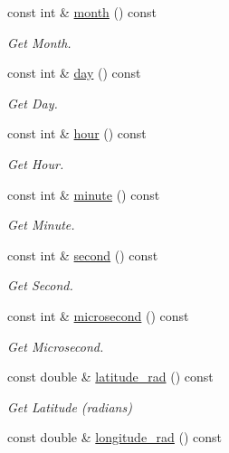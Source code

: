 \begin{DoxyCompactItemize}
const int \& \hyperlink{classosse_1_1collaborate_1_1_packet_raw_a1aec62b6f1c6ca8a332cbc1a9c299e25}{month} () const
\begin{DoxyCompactList}\small\item\em Get Month. \end{DoxyCompactList}\item 
const int \& \hyperlink{classosse_1_1collaborate_1_1_packet_raw_a4c492fb013220d09d08a6635c12ec055}{day} () const
\begin{DoxyCompactList}\small\item\em Get Day. \end{DoxyCompactList}\item 
const int \& \hyperlink{classosse_1_1collaborate_1_1_packet_raw_a265e1fc70e832947969c3d3b28b627cf}{hour} () const
\begin{DoxyCompactList}\small\item\em Get Hour. \end{DoxyCompactList}\item 
const int \& \hyperlink{classosse_1_1collaborate_1_1_packet_raw_ac8dab9ede92438259281e25bed6a72af}{minute} () const
\begin{DoxyCompactList}\small\item\em Get Minute. \end{DoxyCompactList}\item 
const int \& \hyperlink{classosse_1_1collaborate_1_1_packet_raw_a889491ddfb2a3602bae83ca547f7c45e}{second} () const
\begin{DoxyCompactList}\small\item\em Get Second. \end{DoxyCompactList}\item 
const int \& \hyperlink{classosse_1_1collaborate_1_1_packet_raw_ae1988405764da791632e1d272b321873}{microsecond} () const
\begin{DoxyCompactList}\small\item\em Get Microsecond. \end{DoxyCompactList}\item 
const double \& \hyperlink{classosse_1_1collaborate_1_1_packet_raw_ad5e2fab8d02a3a1219c7d9c0efeda5d3}{latitude\+\_\+rad} () const
\begin{DoxyCompactList}\small\item\em Get Latitude (radians) \end{DoxyCompactList}\item 
const double \& \hyperlink{classosse_1_1collaborate_1_1_packet_raw_a3ce663da9c6fb9dbff2238acc6a88841}{longitude\+\_\+rad} () const

\end{DoxyCompactItemize}
